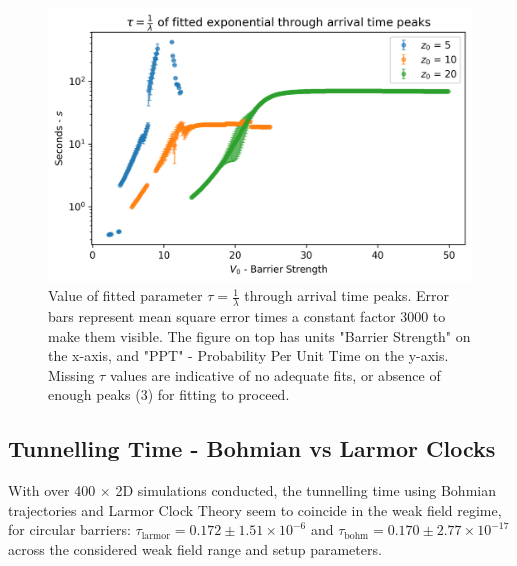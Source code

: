\begin{figure}
    \includegraphics[width=1\linewidth]{Figures//Yoshida/e5c951e3-0e44-432a-b02f-c071aa8b88d5.png}
    \caption{Value of fitted parameter $\tau = \frac{1}{\lambda}$ through arrival time peaks. Error bars represent mean square error times a constant factor 3000 to make them visible. The figure on top has units "Barrier Strength" on the x-axis, and "PPT" - Probability Per Unit Time on the y-axis. Missing $\tau$ values are indicative of no adequate fits, or absence of enough peaks (3) for fitting to proceed.}
    \label{fig:peak_barrier_vs_j}
\end{figure}


\subsection{Tunnelling Time - Bohmian vs Larmor Clocks}

With over 400 $\times$ 2D simulations conducted, the tunnelling time using Bohmian trajectories and Larmor Clock Theory seem to coincide in the weak field regime, for circular barriers: $\tau_{\text{larmor}} = 0.172 \pm1.51\times10^{-6}$ and $\tau_{\text{bohm}} = 0.170 \pm2.77\times10^{-17}$ across the considered weak field range and setup parameters.

